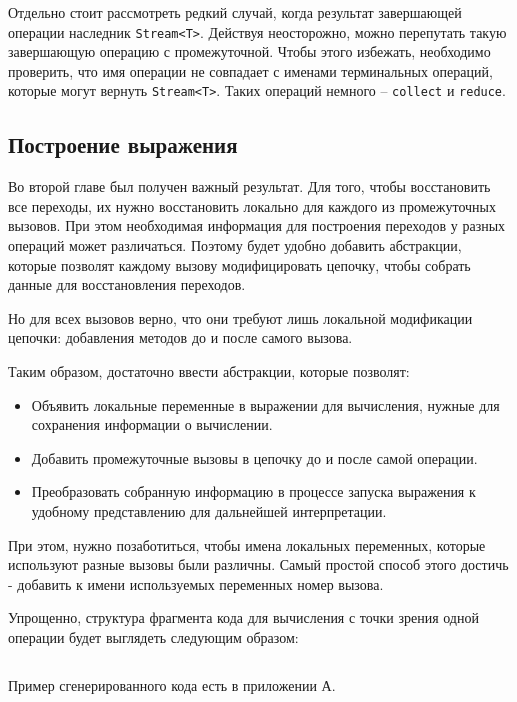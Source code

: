 Отдельно стоит рассмотреть редкий случай, когда результат завершающей операции наследник \texttt{Stream<T>}. Действуя неосторожно, можно перепутать такую завершающую операцию с промежуточной. Чтобы этого избежать, необходимо проверить, что имя операции не совпадает с именами терминальных операций, которые могут вернуть \texttt{Stream<T>}. Таких операций немного -- \texttt{collect} и \texttt{reduce}.

\subsection{Построение выражения}
Во второй главе был получен важный результат. Для того, чтобы восстановить все переходы, их нужно восстановить локально для каждого из промежуточных вызовов. При этом необходимая информация для построения переходов у разных операций может различаться. Поэтому будет удобно добавить абстракции, которые позволят каждому вызову модифицировать цепочку, чтобы собрать данные для восстановления переходов. 

Но для всех вызовов верно, что они требуют лишь локальной модификации цепочки: добавления методов до и после самого вызова. 

Таким образом, достаточно ввести абстракции, которые позволят:
\begin{itemize}
	\item Объявить локальные переменные в выражении для вычисления, нужные для сохранения информации о вычислении.
	\item Добавить промежуточные вызовы в цепочку до и после самой операции.
	\item Преобразовать собранную информацию в процессе запуска выражения к удобному представлению для дальнейшей интерпретации.
\end{itemize}

При этом, нужно позаботиться, чтобы имена локальных переменных, которые используют разные вызовы были различны. Самый простой способ этого достичь - добавить к имени используемых переменных номер вызова.

Упрощенно, структура фрагмента кода для вычисления с точки зрения одной операции будет выглядеть следующим образом:

\inputminted{java}{chapter3/code/EvalCode.java}

Пример сгенерированного кода есть в приложении А.

